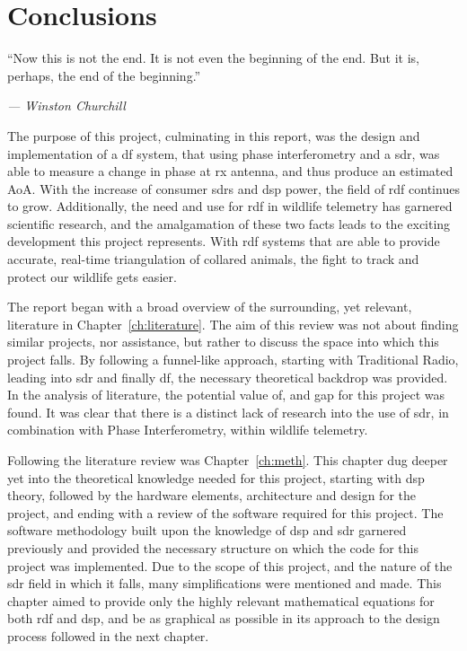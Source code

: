 \documentclass[class=report,11pt,crop=false]{standalone}
\begin{document}
\chapter{Conclusions \label{ch:conclusions}}
\epigraph{``Now this is not the end. It is not even the beginning of the end. But it is, perhaps, the end of the beginning.''}%
    {\emph{--- Winston Churchill}}
\vspace{0.5cm}
The purpose of this project, culminating in this report, was the design and implementation of a \gls{df} system, that using phase interferometry and a \gls{sdr}, was able to measure a change in phase at \gls{rx} antenna, and thus produce an estimated \gls{AoA}. With the increase of consumer \gls{sdr}s and \gls{dsp} power, the field of \gls{rdf} continues to grow. Additionally, the need and use for \gls{rdf} in wildlife telemetry has garnered scientific research, and the amalgamation of these two facts leads to the exciting development this project represents. With \gls{rdf} systems that are able to provide accurate, real-time triangulation of collared animals, the fight to track and protect our wildlife gets easier. 

The report began with a broad overview of the surrounding, yet relevant, literature in Chapter~\ref{ch:literature}. The aim of this review was not about finding similar projects, nor assistance, but rather to discuss the space into which this project falls. By following a funnel-like approach, starting with Traditional Radio, leading into \gls{sdr} and finally \gls{df}, the necessary theoretical backdrop was provided. In the analysis of literature, the potential value of, and gap for this project was found. It was clear that there is a distinct lack of research into the use of \gls{sdr}, in combination with Phase Interferometry, within wildlife telemetry. 

Following the literature review was Chapter~\ref{ch:meth}. This chapter dug deeper yet into the theoretical knowledge needed for this project, starting with \gls{dsp} theory, followed by the hardware elements, architecture and design for the project, and ending with a review of the software required for this project. The software methodology built upon the knowledge of \gls{dsp} and \gls{sdr} garnered previously and provided the necessary structure on which the code for this project was implemented. Due to the scope of this project, and the nature of the \gls{sdr} field in which it falls, many simplifications were mentioned and made. This chapter aimed to provide only the highly relevant mathematical equations for both \gls{rdf} and \gls{dsp}, and be as graphical as possible in its approach to the design process followed in the next chapter. 
\end{document}
